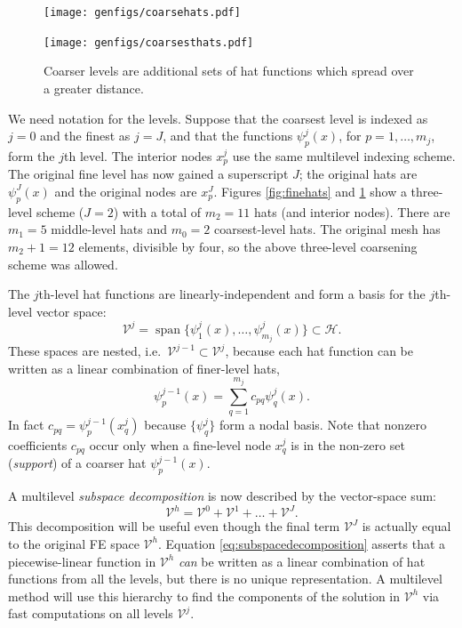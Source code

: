 \documentclass[letterpaper,final,12pt,reqno]{amsart}
\theoremstyle{claim}
\numberwithin{equation}{section}
\numberwithin{figure}{section}
\numberwithin{table}{section}
\begin{document}
\begin{figure}
\texttt{[image: genfigs/coarsehats.pdf]}
\smallskip

\texttt{[image: genfigs/coarsesthats.pdf]}
\caption{Coarser levels are additional sets of hat functions which spread over a greater distance.}
\label{fig:coarsehats}
\end{figure}

We need notation for the levels.  Suppose that the coarsest level is indexed as $j=0$ and the finest as $j=J$, and that the functions $\psi_p^j(x)$, for $p=1,\dots,m_j$, form the $j$th level.  The interior nodes $x_p^j$ use the same multilevel indexing scheme.  The original fine level has now gained a superscript $J$; the original hats are $\psi_p^J(x)$ and the original nodes are $x_p^J$.  Figures \ref{fig:finehats} and \ref{fig:coarsehats} show a three-level scheme ($J=2$) with a total of $m_2=11$ hats (and interior nodes).  There are $m_1=5$ middle-level hats and $m_0=2$ coarsest-level hats.  The original mesh has $m_2+1=12$ elements, divisible by four, so the above three-level coarsening scheme was allowed.

The $j$th-level hat functions are linearly-independent and form a basis for the $j$th-level vector space:
\begin{equation}
  \mathcal{V}^j = \operatorname{span}\{\psi_1^j(x),\dots,\psi_{m_j}^j(x)\} \subset \mathcal{H}.  \label{eq:definevk}
\end{equation}
These spaces are nested, i.e.~$\mathcal{V}^{j-1} \subset \mathcal{V}^j$, because each hat function can be written as a linear combination of finer-level hats,
\begin{equation}
   \psi_p^{j-1}(x) = \sum_{q=1}^{m_j} c_{pq} \psi_q^j(x). \label{eq:hatcombination}
\end{equation}
In fact $c_{pq} = \psi_p^{j-1}(x_q^j)$ because $\{\psi_q^j\}$ form a nodal basis.  Note that nonzero coefficients $c_{pq}$ occur only when a fine-level node $x_q^j$ is in the non-zero set (\emph{support}) of a coarser hat $\psi_p^{j-1}(x)$.

A multilevel \emph{subspace decomposition} is now described by the vector-space sum:
\begin{equation}
  \mathcal{V}^h = \mathcal{V}^0 + \mathcal{V}^1 + \dots + \mathcal{V}^J. \label{eq:subspacedecomposition}
\end{equation}
This decomposition will be useful even though the final term $\mathcal{V}^J$ is actually equal to the original FE space $\mathcal{V}^h$.  Equation \eqref{eq:subspacedecomposition} asserts that a piecewise-linear function in $\mathcal{V}^h$ \emph{can} be written as a linear combination of hat functions from all the levels, but there is no unique representation.  A multilevel method will use this hierarchy to find the components of the solution in $\mathcal{V}^h$ via fast computations on all levels $\mathcal{V}^j$.
\end{document}
